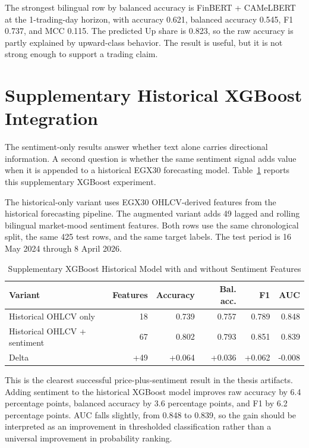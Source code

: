 The strongest bilingual row by balanced accuracy is FinBERT + CAMeLBERT at the 1-trading-day horizon, with accuracy 0.621, balanced accuracy 0.545, F1 0.737, and MCC 0.115. The predicted Up share is 0.823, so the raw accuracy is partly explained by upward-class behavior. The result is useful, but it is not strong enough to support a trading claim.

\section{Supplementary Historical XGBoost Integration}

The sentiment-only results answer whether text alone carries directional information. A second question is whether the same sentiment signal adds value when it is appended to a historical EGX30 forecasting model. Table~\ref{tab:xgb_hybrid_results} reports this supplementary XGBoost experiment.

The historical-only variant uses EGX30 OHLCV-derived features from the historical forecasting pipeline. The augmented variant adds 49 lagged and rolling bilingual market-mood sentiment features. Both rows use the same chronological split, the same 425 test rows, and the same target labels. The test period is 16 May 2024 through 8 April 2026.

\begin{table}[!htbp]
\centering
\caption{Supplementary XGBoost Historical Model with and without Sentiment Features}
\label{tab:xgb_hybrid_results}
\small
\begin{tabular}{lrrrrr}
\toprule
Variant & Features & Accuracy & Bal. acc. & F1 & AUC \\
\midrule
Historical OHLCV only & 18 & 0.739 & 0.757 & 0.789 & 0.848 \\
Historical OHLCV + sentiment & 67 & 0.802 & 0.793 & 0.851 & 0.839 \\
\midrule
Delta & +49 & +0.064 & +0.036 & +0.062 & -0.008 \\
\bottomrule
\end{tabular}
\end{table}
\FloatBarrier

This is the clearest successful price-plus-sentiment result in the thesis artifacts. Adding sentiment to the historical XGBoost model improves raw accuracy by 6.4 percentage points, balanced accuracy by 3.6 percentage points, and F1 by 6.2 percentage points. AUC falls slightly, from 0.848 to 0.839, so the gain should be interpreted as an improvement in thresholded classification rather than a universal improvement in probability ranking.

